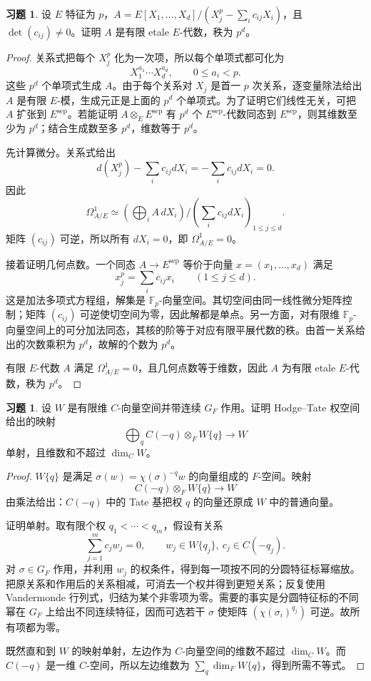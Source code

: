 \documentclass[11pt,a4paper,openany]{ctexbook}
\numberwithin{equation}{chapter}
\newcommand{\F}{\mathbb{F}}
\theoremstyle{plain}
\theoremstyle{definition}
\newtheorem{exercise}[theorem]{习题}
\theoremstyle{remark}
\begin{document}
\begin{exercise}
设 $E$ 特征为 $p$，$A=E[X_1,\ldots,X_d]/(X_j^p-\sum_i c_{ij}X_i)$，且 $\det(c_{ij})\ne0$。证明 $A$ 是有限 etale $E$-代数，秩为 $p^d$。
\end{exercise}

\begin{proof}
关系式把每个 $X_j^p$ 化为一次项，所以每个单项式都可化为
\[
  X_1^{a_1}\cdots X_d^{a_d},\qquad 0\le a_i<p.
\]
这些 $p^d$ 个单项式生成 $A$。由于每个关系对 $X_j$ 是首一 $p$ 次关系，逐变量除法给出 $A$ 是有限 $E$-模，生成元正是上面的 $p^d$ 个单项式。为了证明它们线性无关，可把 $A$ 扩张到 $E^{\mathrm{sep}}$。若能证明 $A\otimes_EE^{\mathrm{sep}}$ 有 $p^d$ 个 $E^{\mathrm{sep}}$-代数同态到 $E^{\mathrm{sep}}$，则其维数至少为 $p^d$；结合生成数至多 $p^d$，维数等于 $p^d$。

先计算微分。关系式给出
\[
  d(X_j^p)-\sum_i c_{ij}dX_i=-\sum_i c_{ij}dX_i=0.
\]
因此
\[
  \Omega^1_{A/E}\simeq
  \left(\bigoplus_i A\,dX_i\right)\Big/
  \left(\sum_i c_{ij}dX_i\right)_{1\le j\le d}.
\]
矩阵 $(c_{ij})$ 可逆，所以所有 $dX_i=0$，即 $\Omega^1_{A/E}=0$。

接着证明几何点数。一个同态 $A\to E^{\mathrm{sep}}$ 等价于向量 $x=(x_1,\ldots,x_d)$ 满足
\[
  x_j^p=\sum_i c_{ij}x_i\qquad(1\le j\le d).
\]
这是加法多项式方程组，解集是 $\F_p$-向量空间。其切空间由同一线性微分矩阵控制；矩阵 $(c_{ij})$ 可逆使切空间为零，因此解都是单点。另一方面，对有限维 $\F_p$-向量空间上的可分加法同态，其核的阶等于对应有限平展代数的秩。由首一关系给出的次数乘积为 $p^d$，故解的个数为 $p^d$。

有限 $E$-代数 $A$ 满足 $\Omega^1_{A/E}=0$，且几何点数等于维数，因此 $A$ 为有限 etale $E$-代数，秩为 $p^d$。
\end{proof}

\begin{exercise}
设 $W$ 是有限维 $C$-向量空间并带连续 $G_F$ 作用。证明 Hodge--Tate 权空间给出的映射
\[
  \bigoplus_q C(-q)\otimes_F W\{q\}\to W
\]
单射，且维数和不超过 $\dim_CW$。
\end{exercise}

\begin{proof}
$W\{q\}$ 是满足 $\sigma(w)=\chi(\sigma)^{-q}w$ 的向量组成的 $F$-空间。映射
\[
  C(-q)\otimes_F W\{q\}\to W
\]
由乘法给出：$C(-q)$ 中的 Tate 基把权 $q$ 的向量还原成 $W$ 中的普通向量。

证明单射。取有限个权 $q_1<\cdots<q_m$，假设有关系
\[
  \sum_{j=1}^m c_j w_j=0,\qquad
  w_j\in W\{q_j\},\ c_j\in C(-q_j).
\]
对 $\sigma\in G_F$ 作用，并利用 $w_j$ 的权条件，得到每一项按不同的分圆特征标幂缩放。把原关系和作用后的关系相减，可消去一个权并得到更短关系；反复使用 Vandermonde 行列式，归结为某个非零项为零。需要的事实是分圆特征标的不同幂在 $G_F$ 上给出不同连续特征，因而可选若干 $\sigma$ 使矩阵 $(\chi(\sigma_i)^{q_j})$ 可逆。故所有项都为零。

既然直和到 $W$ 的映射单射，左边作为 $C$-向量空间的维数不超过 $\dim_CW$。而 $C(-q)$ 是一维 $C$-空间，所以左边维数为 $\sum_q\dim_F W\{q\}$，得到所需不等式。
\end{proof}
\end{document}
